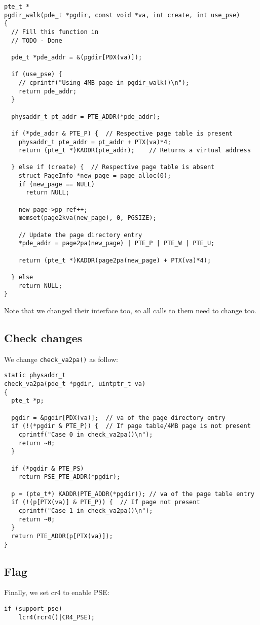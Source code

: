 \documentclass[]{article}
\begin{document}
\begin{verbatim}
pte_t *
pgdir_walk(pde_t *pgdir, const void *va, int create, int use_pse)
{
  // Fill this function in
  // TODO - Done

  pde_t *pde_addr = &(pgdir[PDX(va)]);

  if (use_pse) {
    // cprintf("Using 4MB page in pgdir_walk()\n");
    return pde_addr;
  }

  physaddr_t pt_addr = PTE_ADDR(*pde_addr);
  
  if (*pde_addr & PTE_P) {	// Respective page table is present
    physaddr_t pte_addr = pt_addr + PTX(va)*4;
    return (pte_t *)KADDR(pte_addr);	// Returns a virtual address

  } else if (create) {	// Respective page table is absent
    struct PageInfo *new_page = page_alloc(0);
    if (new_page == NULL)
      return NULL;

    new_page->pp_ref++;
    memset(page2kva(new_page), 0, PGSIZE);

    // Update the page directory entry
    *pde_addr = page2pa(new_page) | PTE_P | PTE_W | PTE_U;

    return (pte_t *)KADDR(page2pa(new_page) + PTX(va)*4);

  } else
    return NULL;
}
\end{verbatim}

Note that we changed their interface too, so all calls to them need to change too.

\subsection*{Check changes}

We change \verb|check_va2pa()| as follow:

\begin{verbatim}
static physaddr_t
check_va2pa(pde_t *pgdir, uintptr_t va)
{
  pte_t *p;

  pgdir = &pgdir[PDX(va)];	// va of the page directory entry
  if (!(*pgdir & PTE_P)) {	// If page table/4MB page is not present
    cprintf("Case 0 in check_va2pa()\n");
    return ~0;
  }

  if (*pgdir & PTE_PS)
    return PSE_PTE_ADDR(*pgdir);

  p = (pte_t*) KADDR(PTE_ADDR(*pgdir)); // va of the page table entry
  if (!(p[PTX(va)] & PTE_P)) {	// If page not present
    cprintf("Case 1 in check_va2pa()\n");
    return ~0;
  }
  return PTE_ADDR(p[PTX(va)]);
}
\end{verbatim}

\subsection*{Flag}

Finally, we set cr4 to enable PSE:

\begin{verbatim}
if (support_pse)
	lcr4(rcr4()|CR4_PSE);
\end{verbatim}
\end{document}
